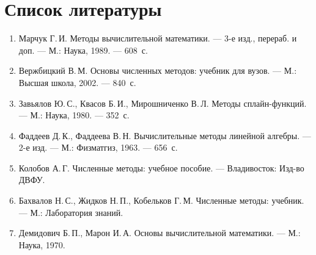 \documentclass[a4paper,14pt]{extarticle}
\begin{document}
\section*{Список литературы}

\begin{enumerate}
\item Марчук Г.\,И. Методы вычислительной математики. --- 3-е изд., перераб. и доп. --- М.: Наука, 1989. --- 608~с.
\item Вержбицкий В.\,М. Основы численных методов: учебник для вузов. --- М.: Высшая школа, 2002. --- 840~с.
\item Завьялов Ю.\,С., Квасов Б.\,И., Мирошниченко В.\,Л. Методы сплайн-функций. --- М.: Наука, 1980. --- 352~с.
\item Фаддеев Д.\,К., Фаддеева В.\,Н. Вычислительные методы линейной алгебры. --- 2-е изд. --- М.: Физматгиз, 1963. --- 656~с.
\item Колобов А.\,Г. Численные методы: учебное пособие. --- Владивосток: Изд-во ДВФУ.
\item Бахвалов Н.\,С., Жидков Н.\,П., Кобельков Г.\,М. Численные методы: учебник. --- М.: Лаборатория знаний.
\item Демидович Б.\,П., Марон И.\,А. Основы вычислительной математики. --- М.: Наука, 1970.
\end{enumerate}
\end{document}
